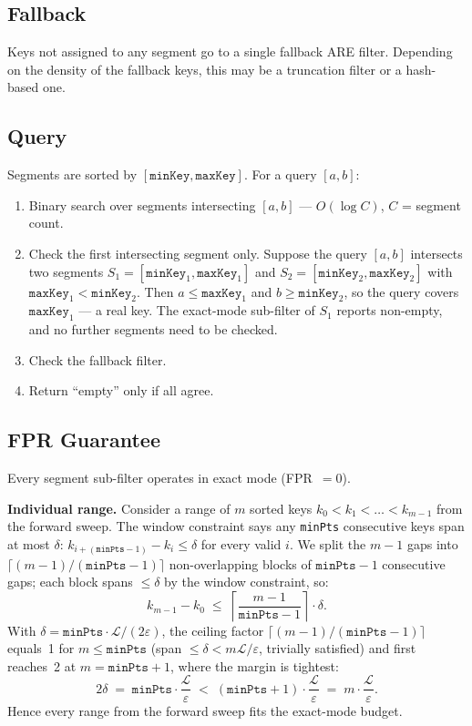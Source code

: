 \subsection{Fallback}

Keys not assigned to any segment go to a single fallback ARE filter.
Depending on the density of the fallback keys, this may be a truncation filter
or a hash-based one.

\subsection{Query}\label{subsec:query}

Segments are sorted by $[\texttt{minKey}, \texttt{maxKey}]$. For a query $[a, b]$:
\begin{enumerate}
    \item Binary search over segments intersecting $[a, b]$ --- $O(\log C)$, $C$ = segment
    count.
    \item Check the first intersecting segment only.
    Suppose the query $[a, b]$
    intersects two segments $S_1 = [\texttt{minKey}_1, \texttt{maxKey}_1]$ and
    $S_2 = [\texttt{minKey}_2, \texttt{maxKey}_2]$ with $\texttt{maxKey}_1 < \texttt{minKey}_2$.
    Then $a \leq \texttt{maxKey}_1$ and $b \geq \texttt{minKey}_2$, so the query covers
    $\texttt{maxKey}_1$ --- a real key.
    The exact-mode sub-filter of $S_1$ reports
    non-empty, and no further segments need to be checked.
    \item Check the fallback filter.
    \item Return ``empty'' only if all agree.
\end{enumerate}

\subsection{FPR Guarantee}\label{subsec:fpr-guarantee}

Every segment sub-filter operates in exact mode (FPR~$= 0$).

\textbf{Individual range.} Consider a range of $m$ sorted keys
$k_0 < k_1 < \dots < k_{m-1}$ from the forward sweep.
The window constraint says any \texttt{minPts} consecutive keys span at most
$\delta$: $k_{i+(\texttt{minPts}-1)} - k_i \leq \delta$ for every valid $i$.
We split the $m-1$ gaps into $\lceil(m-1)/(\texttt{minPts}-1)\rceil$
non-overlapping blocks of $\texttt{minPts}-1$ consecutive gaps; each block
spans $\leq \delta$ by the window constraint, so:
\[
    k_{m-1} - k_0 \;\leq\; \left\lceil \frac{m-1}{\texttt{minPts}-1} \right\rceil \cdot \delta.
\]
With $\delta = \texttt{minPts}\cdot\mathcal{L}/(2\varepsilon)$, the ceiling factor
$\lceil(m-1)/(\texttt{minPts}-1)\rceil$ equals~1 for $m \leq \texttt{minPts}$
(span $\leq \delta < m\mathcal{L}/\varepsilon$, trivially satisfied) and first
reaches~2 at $m = \texttt{minPts}+1$, where the margin is tightest:
\[
    2\delta \;=\; \texttt{minPts} \cdot \frac{\mathcal{L}}{\varepsilon}
    \;<\; (\texttt{minPts}+1) \cdot \frac{\mathcal{L}}{\varepsilon}
    \;=\; m \cdot \frac{\mathcal{L}}{\varepsilon}.
\]
Hence every range from the forward sweep fits the exact-mode budget.

